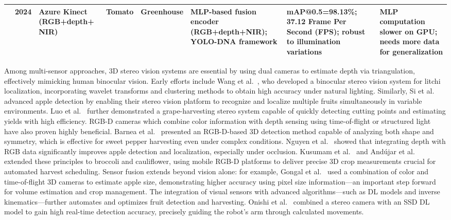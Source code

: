 \documentclass{ieeeaccess}
\begin{document}
\begin{table}[ht]
\begin{tabular}{p{}p{}p{}p{}p{}p{}p{}p{}}
\hline
\cite{chen2024mlp} & 2024 & Azure Kinect (RGB+depth+ NIR) & Tomato & Greenhouse & MLP-based fusion encoder (RGB+depth+NIR); YOLO-DNA framework & mAP@0.5=98.13\%; 37.12 Frame Per Second (FPS); robust to illumination variations & MLP computation slower on GPU; needs more data for generalization  \\
\hline
\end{tabular}
\end{table}
\fi

Among multi-sensor approaches, 3D stereo vision systems are essential by using dual cameras to estimate depth via triangulation, effectively mimicking human binocular vision. Early efforts include Wang et al.~\cite{wang2016localisation}, who developed a binocular stereo vision system for litchi localization, incorporating wavelet transforms and clustering methods to obtain high accuracy under natural lighting. Similarly, Si et al.~\cite{si2015location} advanced apple detection by enabling their stereo vision platform to recognize and localize multiple fruits simultaneously in variable environments. Luo et al.~\cite{luo2016vision} further demonstrated a grape-harvesting stereo system capable of quickly detecting cutting points and estimating yields with high efficiency.
RGB-D cameras which combine color information with depth sensing using time-of-flight or structured light have also proven highly beneficial. Barnea et al.~\cite{barnea2016colour} presented an RGB-D-based 3D detection method capable of analyzing both shape and symmetry, which is effective for sweet pepper harvesting even under complex conditions. Nguyen et al.~\cite{nguyen2016detection} showed that integrating depth with RGB data significantly improves apple detection and localization, especially under occlusion. Kusumam et al.~\cite{kusumam20173d} and Andújar et al.~\cite{andujar2016using} extended these principles to broccoli and cauliflower, using mobile RGB-D platforms to deliver precise 3D crop measurements crucial for automated harvest scheduling.
Sensor fusion extends beyond vision alone: for example, Gongal et al.~\cite{gongal2018apple} used a combination of color and time-of-flight 3D cameras to estimate apple size, demonstrating higher accuracy using pixel size information—an important step forward for volume estimation and crop management.
The integration of visual sensors with advanced algorithms—such as DL models and inverse kinematics—further automates and optimizes fruit detection and harvesting. Onishi et al.~\cite{onishi2019automated} combined a stereo camera with an SSD DL model to gain high real-time detection accuracy, precisely guiding the robot's arm through calculated movements.
\end{document}
